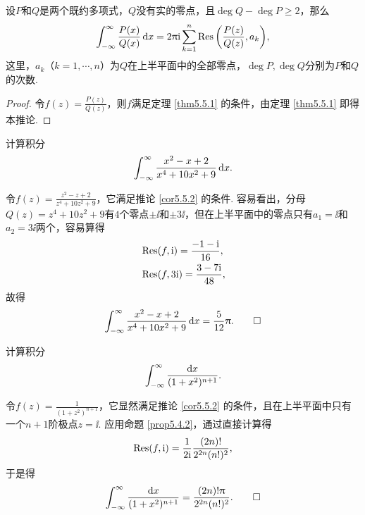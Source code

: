 \begin{corollary}\label{cor5.5.2}
  设$P$和$Q$是两个既约多项式，$Q$没有实的零点，且$\deg Q-\deg P\ge2$，那么
  \[
    \int_{-\infty}^\infty\frac{P(x)}{Q(x)}\mathop{}\!\mathrm dx=2\uppi\mathrm i\sum_{k=1}^n
    \operatorname*{Res}\bigg(\frac{P(z)}{Q(z)},a_k\bigg),
  \]
这里，$a_k$（$k=1,\cdots,n$）为$Q$在上半平面中的全部零点，$\deg P,\deg Q$分别为$P$和$Q$的次数.
\end{corollary}
\begin{proof}
  令$f(z)=\frac{P(z)}{Q(z)}$，则$f$满足定理 \ref{thm5.5.1} 的条件，由定理 \ref{thm5.5.1} 即得本推论.
\end{proof}
\begin{example}\label{exam5.5.3}
  计算积分
  \[
    \int_{-\infty}^\infty \frac{x^2-x+2}{x^4+10x^2+9} \mathop{}\!\mathrm dx.
  \]
\end{example}
\begin{solution}
  令$f(z)=\frac{z^2-z+2}{z^4+10z^2+9}$，它满足推论 \ref{cor5.5.2} 的条件. 容易看出，分母$Q(z)=z^4+10z^2+9$有$4$个零点$\pm\ii$和$\pm3\ii$，但在上半平面中的零点只有$a_1=\ii$和$a_2=3\ii$两个，容易算得
  \begin{align*}
    & \operatorname*{Res}(f,\mathrm i) = \frac{-1-\mathrm i}{16},\\
    & \operatorname*{Res}(f,3\mathrm i) = \frac{3-7\mathrm i}{48},
  \end{align*}
  故得
  \begin{equation*}
    \int_{-\infty}^\infty\frac{x^2-x+2}{x^4+10x^2+9}\mathop{}\!\mathrm dx = \frac5{12}\uppi. \qedhere
  \end{equation*}
\end{solution}

\begin{example}\label{exam5.5.4}
  计算积分
  \[
    \int_{-\infty}^\infty\frac{\mathop{}\!\mathrm dx}{(1+x^2)^{n+1}}.
  \]
\end{example}
\begin{solution}
  令$f(z)=\frac1{(1+z^2)^{n+1}}$，它显然满足推论 \ref{cor5.5.2} 的条件，且在上半平面中只有一个$n+1$阶极点$z=\ii$. 应用命题 \ref{prop5.4.2}，通过直接计算得
  \[
    \operatorname*{Res}(f,\mathrm i) = \frac1{2\mathrm i}\frac{(2n)!}{2^{2n}(n!)^2},
  \]
  于是得
  \begin{equation*}
    \int_{-\infty}^\infty\frac{\mathop{}\!\mathrm dx}{(1+x^2)^{n+1}} = \frac{(2n)!\uppi}{2^{2n}(n!)^2}. \qedhere
  \end{equation*}
\end{solution}


